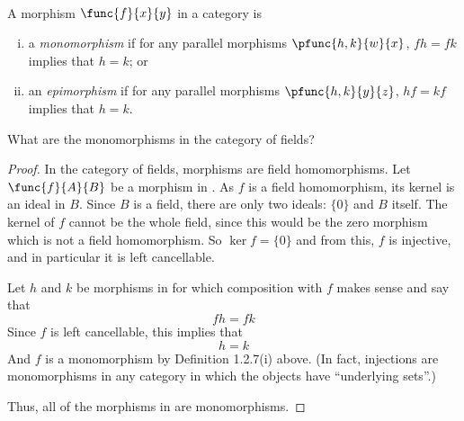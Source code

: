 \documentclass[main.tex]{subfiles}
\begin{document}
\paragraph{}
\begin{definition}
	A morphism \(\func{f}{x}{y}\) in a category is
	\begin{enumerate}[(i)]
		\item a \emph{monomorphism} if for any parallel morphisms
		\(\pfunc{h,k}{w}{x}\), \(fh=fk\) implies that \(h=k\); or
		\item an \emph{epimorphism} if for any parallel morphisms
		\(\pfunc{h,k}{y}{z}\), \(hf=kf\) implies that \(h=k\).
	\end{enumerate}
\end{definition}
\popthm

\begin{exercise}
	What are the monomorphisms in the category of fields?
\end{exercise}
\begin{proof}
In the category of fields, morphisms are field homomorphisms. Let
\(\func{f}{A}{B}\) be a morphism in \Field. As \(f\) is a field homomorphism,
its kernel is an ideal in \(B\). Since \(B\) is a field, there are only two
ideals: \(\{0\}\) and \(B\) itself. The kernel of \(f\) cannot be the whole
field, since this would be the zero morphism which is not a field homomorphism.
So \(\ker f = \{0\}\) and from this, \(f\) is injective, and in particular it is
left cancellable.

Let \(h\) and \(k\) be morphisms in \Field for which composition with \(f\)
makes sense and say that \[fh = fk\] Since \(f\) is left cancellable, this
implies that \[h = k\] And \(f\) is a monomorphism by Definition 1.2.7(i) above.
(In fact, injections are monomorphisms in any category in which the objects have
``underlying sets''.)

Thus, all of the morphisms in \Field are monomorphisms.
\end{proof}
\end{document}
